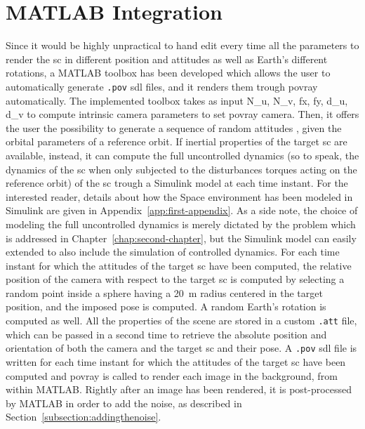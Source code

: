 \section{MATLAB Integration}
Since it would be highly unpractical to hand edit every time all the parameters to render the \acrshort{sc} in different position and attitudes as well as Earth's different rotations, a MATLAB toolbox has been developed which allows the user to automatically generate \texttt{.pov} \acrshort{sdl} files, and it renders them trough \acrshort{povray} automatically.
The implemented toolbox takes as input \gls{N_u}, \gls{N_v}, \gls{fx}, \gls{fy}, \gls{d_u}, \gls{d_v} to compute intrinsic camera parameters to set \acrshort{povray} camera.
Then, it offers the user the possibility to generate a sequence of random attitudes \cite{Arvo92}, given the orbital parameters of a reference orbit. If inertial properties of the target \acrshort{sc} are available, instead, it can compute the full uncontrolled dynamics (so to speak, the dynamics of the \acrshort{sc} when only subjected to the disturbances torques acting on the reference orbit) of the \acrshort{sc} trough a Simulink model at each time instant.  For the interested reader, details about how the Space environment has been modeled in Simulink are given in Appendix~\ref{app:first-appendix}. As a side note, the choice of modeling the full uncontrolled dynamics is merely dictated by the problem which is addressed in Chapter~\ref{chap:second-chapter}, but the Simulink model can easily extended to also include the simulation of controlled dynamics.
For each time instant for which the attitudes of the target \acrshort{sc} have been computed, the relative position of the camera with respect to the target \acrshort{sc} is computed by selecting a random point inside a sphere having a \SI{20}{\m} radius centered in the target position, and the imposed pose is computed. A random Earth's rotation is computed as well.
All the properties of the scene are stored in a custom \texttt{.att} file, which can be passed in a second time to retrieve the absolute position and orientation of both the camera and the target \acrshort{sc} and their pose.
A \texttt{.pov} \acrshort{sdl} file is written for each time instant for which the attitudes of the target \acrshort{sc} have been computed and \acrshort{povray} is called to render each image in the background, from within MATLAB. Rightly after an image has been rendered, it is post-processed by MATLAB in order to add the noise, as described in Section~\ref{subsection:addingthenoise}.


